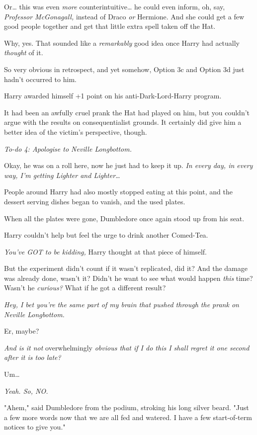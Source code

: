Or{\ldots} this was even \emph{more} counterintuitive{\ldots} he could even 
inform, oh, say, \emph{Professor McGonagall,} instead of Draco \emph{or} 
Hermione. And she could get a few good people together and get that little 
extra spell taken off the Hat.

Why, yes. That sounded like a \emph{remarkably} good idea once Harry had 
actually \emph{thought} of it.

So very obvious in retrospect, and yet somehow, Option 3c and Option 3d just 
hadn't occurred to him.

Harry awarded himself +1 point on his anti-Dark-Lord-Harry program.

It had been an awfully cruel prank the Hat had played on him, but you couldn't 
argue with the results on consequentialist grounds. It certainly did give him a 
better idea of the victim's perspective, though.

\emph{To-do 4: Apologise to Neville Longbottom.}

Okay, he was on a roll here, now he just had to keep it up. \emph{In every day, 
in every way, I'm getting Lighter and Lighter{\ldots}}

People around Harry had also mostly stopped eating at this point, and the 
dessert serving dishes began to vanish, and the used plates.

When all the plates were gone, Dumbledore once again stood up from his seat.

Harry couldn't help but feel the urge to drink another Comed-Tea.

\emph{You've GOT to be kidding,} Harry thought at that piece of himself.

But the experiment didn't count if it wasn't replicated, did it? And the damage 
was already done, wasn't it? Didn't he want to see what would happen 
\emph{this} time? Wasn't he \emph{curious?} What if he got a different result?

\emph{Hey, I bet you're the same part of my brain that pushed through the prank 
on Neville Longbottom.}

Er, maybe?

\emph{And is it not} overwhelmingly\emph{ obvious that if I do this I shall 
regret it one second after it is too late?}

Um{\ldots}

\emph{Yeah. So, NO.}

"Ahem," said Dumbledore from the podium, stroking his long silver beard. "Just 
a few more words now that we are all fed and watered. I have a few 
start-of-term notices to give you."

